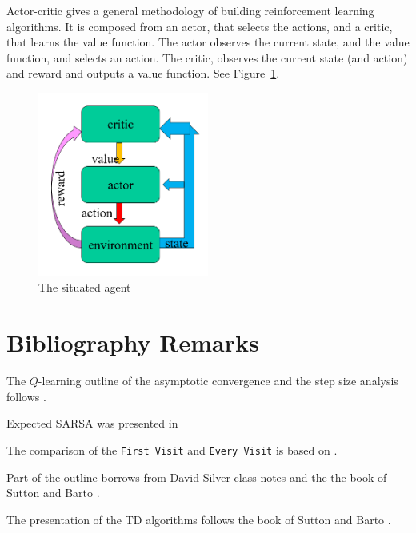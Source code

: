 Actor-critic gives a general methodology of building reinforcement
learning algorithms. It is composed from an actor, that selects the
actions, and a critic, that learns the value function. The actor
observes the current state, and the value function, and selects an
action. The critic, observes the current state (and action) and
reward and outputs a value function. See
Figure~\ref{fig:L7-Actor-Critic}.

\begin{figure}
  \begin{centering}
  \includegraphics[width=0.5\textwidth]{figures/L7-Actor-Critic}
  \caption{The situated agent}\label{fig:L7-Actor-Critic}
  \end{centering}
\end{figure}





\section{Bibliography Remarks}

The $Q$-learning outline of the asymptotic convergence and the step
size analysis follows \cite{Even-DarM03}.

Expected SARSA was presented in \cite{SeijenHWW09}

The comparison of the {\tt First Visit} and {\tt Every Visit} is
based on \cite{SinghS96}.

Part of the outline borrows from David Silver class notes and the
the book of Sutton and Barto \cite{SuttonB98}.


The presentation of the TD algorithms follows the book of Sutton and
Barto \cite{SuttonB98}.
